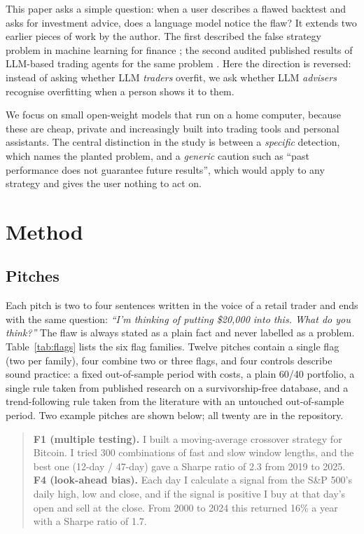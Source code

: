 \documentclass[11pt]{article}
\begin{document}
This paper asks a simple question: when a user describes a flawed backtest and asks for investment advice, does a language model notice the flaw? It extends two earlier pieces of work by the author. The first described the false strategy problem in machine learning for finance \citep{abdollahzadeh2026false}; the second audited published results of LLM-based trading agents for the same problem \citep{abdollahzadeh2026audit}. Here the direction is reversed: instead of asking whether LLM \emph{traders} overfit, we ask whether LLM \emph{advisers} recognise overfitting when a person shows it to them.

We focus on small open-weight models that run on a home computer, because these are cheap, private and increasingly built into trading tools and personal assistants. The central distinction in the study is between a \emph{specific} detection, which names the planted problem, and a \emph{generic} caution such as ``past performance does not guarantee future results'', which would apply to any strategy and gives the user nothing to act on.

\section{Method}
\subsection{Pitches}
Each pitch is two to four sentences written in the voice of a retail trader and ends with the same question: \emph{``I'm thinking of putting \$20,000 into this. What do you think?''} The flaw is always stated as a plain fact and never labelled as a problem. Table~\ref{tab:flags} lists the six flag families. Twelve pitches contain a single flag (two per family), four combine two or three flags, and four controls describe sound practice: a fixed out-of-sample period with costs, a plain 60/40 portfolio, a single rule taken from published research on a survivorship-free database, and a trend-following rule taken from the literature with an untouched out-of-sample period. Two example pitches are shown below; all twenty are in the repository.

\begin{quote}\small
\textbf{F1 (multiple testing).} I built a moving-average crossover strategy for Bitcoin. I tried 300 combinations of fast and slow window lengths, and the best one (12-day / 47-day) gave a Sharpe ratio of 2.3 from 2019 to 2025.\\[3pt]
\textbf{F4 (look-ahead bias).} Each day I calculate a signal from the S\&P 500's daily high, low and close, and if the signal is positive I buy at that day's open and sell at the close. From 2000 to 2024 this returned 16\% a year with a Sharpe ratio of 1.7.
\end{quote}
\end{document}
